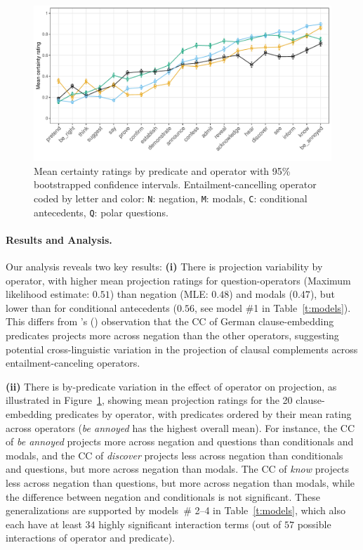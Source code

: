 \documentclass[11pt, a4paper]{article}
\newcommand{\posscite}[1]{\citeauthor{#1}'s (\citeyear{#1})}
\begin{document}
\begin{figure}[ht]
	\vspace{-.5\baselineskip}
	\centering
	\includegraphics[width=\textwidth]{graphs/proj-by-both.pdf}
	\caption{\small Mean certainty ratings by predicate and operator with 95\% bootstrapped confidence intervals. Entailment-cancelling operator coded by letter and color:  \textcolor{orangee}{\texttt{N}: negation}, \texttt{M}: modals, \textcolor{greenn}{\texttt{C}: conditional antecedents}, \textcolor{bluee}{\texttt{Q}: polar questions}.}
	\label{fig:figure1}
\end{figure}

\paragraph{Results and Analysis.}
	Our analysis reveals two key results: \textbf{(i)} There is projection variability by operator, with higher mean projection ratings for question-operators (Maximum likelihood estimate: $0.51$) than negation (MLE: $0.48$) and modals ($0.47$), but lower than for conditional antecedents ($0.56$, see model \#1 in Table\ \ref{t:models}).
	This differs from \posscite{sieker_projective_2022} observation that the CC of German clause-embedding predicates projects more across negation than the other operators, suggesting potential cross-linguistic variation in the projection of clausal complements across entailment-canceling operators.
	
	\textbf{(ii)} There is by-predicate variation in the effect of operator on projection, as illustrated in Figure~\ref{fig:figure1}, showing mean projection ratings for the 20 clause-embedding predicates by operator, with predicates ordered by their mean rating across operators (\emph{be annoyed} has the highest overall mean).
	For instance, the CC of \emph{be annoyed} projects more across negation and questions than conditionals and modals, and the CC of \emph{discover} projects less across negation than conditionals and questions, but more across negation than modals. The CC of \emph{know} projects less across negation than questions, but more across negation than modals, while the difference between negation and conditionals is not significant.
	These generalizations are supported by models\ \# 2--4 in Table\ \ref{t:models}, which also each have at least $34$ highly significant interaction terms (out of $57$ possible interactions of operator and predicate).
\end{document}
